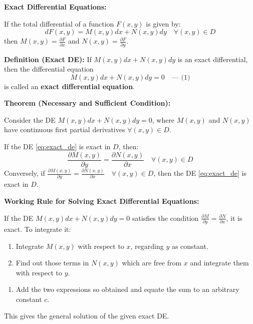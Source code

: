 \documentclass[11pt,a4paper]{article}
\newcommand{\Heading}[1]{\vspace{0.3cm}\noindent\textbf{\textcolor{AcademicGreen}{\large #1}}\par\vspace{0.15cm}}
\begin{document}
\Heading{Exact Differential Equations:}
If the total differential of a function $F(x,y)$ is given by:
\[
dF(x,y) = M(x,y)dx + N(x,y)dy \quad \forall (x,y) \in D
\]
then $M(x,y) = \frac{\partial F}{\partial x}$ and $N(x,y) = \frac{\partial F}{\partial y}$.

\vspace{0.2cm}
\noindent\textbf{Definition (Exact DE):} If $M(x,y)dx + N(x,y)dy$ is an exact differential, then the differential equation
\begin{equation}
    M(x,y)dx + N(x,y)dy = 0 \quad \text{--- (1)} \label{eq:exact_de}
\end{equation}
is called an \textbf{exact differential equation}.

\vspace{0.3cm}
\Heading{Theorem (Necessary and Sufficient Condition):}
Consider the DE $M(x,y)dx + N(x,y)dy = 0$, where $M(x,y)$ and $N(x,y)$ have continuous first partial derivatives $\forall (x,y) \in D$.

\noindent If the DE \eqref{eq:exact_de} is exact in $D$, then:
\[
\frac{\partial M(x,y)}{\partial y} = \frac{\partial N(x,y)}{\partial x} \quad \forall (x,y) \in D
\]
Conversely, if $\frac{\partial M(x,y)}{\partial y} = \frac{\partial N(x,y)}{\partial x} \quad \forall (x,y) \in D$, then the DE \eqref{eq:exact_de} is exact in $D$.

\vspace{0.4cm}
\Heading{Working Rule for Solving Exact Differential Equations:}
If the DE $M(x,y)dx + N(x,y)dy = 0$ satisfies the condition $\frac{\partial M}{\partial y} = \frac{\partial N}{\partial x}$, it is exact. To integrate it:
\begin{enumerate}[label=(\roman*)]
    \item Integrate $M(x,y)$ with respect to $x$, regarding $y$ as constant.
    \item Find out those terms in $N(x,y)$ which are free from $x$ and integrate them with respect to $y$.
\end{enumerate}

\begin{enumerate}[label=(\roman*), resume]
    \item Add the two expressions so obtained and equate the sum to an arbitrary constant $c$.
\end{enumerate}
This gives the general solution of the given exact DE.
\end{document}
